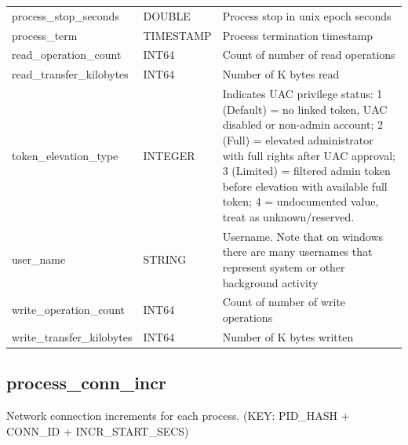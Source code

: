 \documentclass[conference,compsoc]{IEEEtran}
\begin{document}
\begin{longtable}{|p{5cm}|p{2cm}|p{9cm}|}
process\_stop\_seconds & DOUBLE & Process stop in unix epoch seconds \\
process\_term & TIMESTAMP & Process termination timestamp \\
read\_operation\_count & INT64 & Count of number of read operations \\
read\_transfer\_kilobytes & INT64 & Number of K bytes read \\
token\_elevation\_type & INTEGER & Indicates UAC privilege status: 1 (Default) = no linked token, UAC disabled or non-admin account; 2 (Full) = elevated administrator with full rights after UAC approval; 3 (Limited) = filtered admin token before elevation with available full token; 4 = undocumented value, treat as unknown/reserved. \\
user\_name & STRING & Username. Note that on windows there are many usernames that represent system or other background activity \\
write\_operation\_count & INT64 & Count of number of write operations \\
write\_transfer\_kilobytes & INT64 & Number of K bytes written \\
\hline
\end{longtable}

\subsection{process\_conn\_incr}
\label{sec:process_conn_incr}

Network connection increments for each process. (KEY: PID\_HASH + CONN\_ID + INCR\_START\_SECS)
\end{document}
